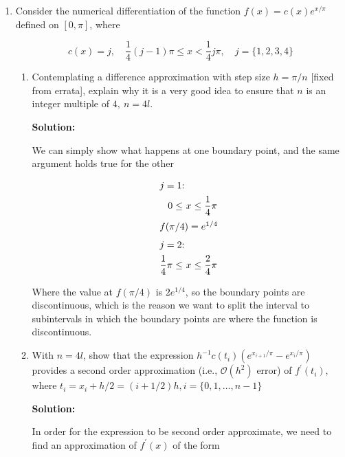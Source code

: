 \documentclass[12pt]{article}
\newcommand{\BigO}[1]{\mathcal{O}\left( #1 \right)}
\begin{document}
\begin{enumerate}
\begin{enumerate}
\end{enumerate}

\item Consider the numerical differentiation of the function $f(x) = c(x) e^{x/\pi}$ defined on $[0, \pi]$, where 

\[
	c(x) = j, \quad \frac{1}{4}(j-1)\pi \leq x < \frac{1}{4}j\pi, \quad j = \{ 1, 2, 3, 4\}
\]

\begin{enumerate}
\item Contemplating a difference approximation with step size $h = \pi/n$ [fixed from errata], explain why it is a very good idea to ensure that $n$ is an integer multiple of $4,\ n = 4l$. 

{\bf Solution:}

We can simply show what happens at one boundary point, and the same argument holds true for the other

\begin{align*}
\intertext{$j = 1$:}
0 \leq\ &x \leq \frac{1}{4}\pi\\
\intertext{$f(\pi/4) = e^{1/4}$}
\intertext{$j = 2$:}
\frac{1}{4}\pi \leq\ &x \leq \frac{2}{4}\pi
\end{align*}

Where the value at $f(\pi/4)$ is $2e^{1/4}$, so the boundary points are discontinuous, which is the reason we want to split the interval to subintervals in which the boundary points are where the function is discontinuous.

\item With $n = 4l$, show that the expression $h^{-1}c(t_{i})\left( e^{x_{i+1}/\pi} - e^{x_{i}/\pi}\right)$ provides a second order approximation (i.e., $\BigO{h^{2}}$ error) of $f^{\prime}(t_{i})$, where $t_{i} = x_{i} + h/2 = (i + 1/2)h, i = \{ 0, 1, \ldots, n-1\}$

{\bf Solution:}

In order for the expression to be second order approximate, we need to find an approximation of $f^{\prime}(x)$ of the form


\end{enumerate}
\end{enumerate}
\end{document}
